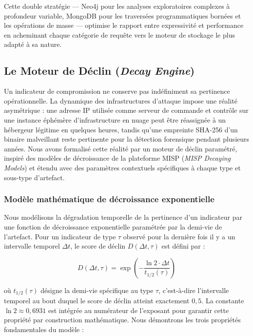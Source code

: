 Cette double stratégie --- Neo4j pour les analyses exploratoires complexes à profondeur variable, MongoDB pour les traversées programmatiques bornées et les opérations de masse --- optimise le rapport entre expressivité et performance en acheminant chaque catégorie de requête vers le moteur de stockage le plus adapté à sa nature.

\subsection{Le Moteur de Déclin (\textit{Decay Engine})}

Un indicateur de compromission ne conserve pas indéfiniment sa pertinence opérationnelle. La dynamique des infrastructures d'attaque impose une réalité asymétrique : une adresse IP utilisée comme serveur de commande et contrôle sur une instance éphémère d'infrastructure en nuage peut être réassignée à un hébergeur légitime en quelques heures, tandis qu'une empreinte SHA-256 d'un binaire malveillant reste pertinente pour la détection forensique pendant plusieurs années. Nous avons formalisé cette réalité par un moteur de déclin paramétré, inspiré des modèles de décroissance de la plateforme MISP (\textit{MISP Decaying Models}) et étendu avec des paramètres contextuels spécifiques à chaque type et sous-type d'artefact.

\subsubsection{Modèle mathématique de décroissance exponentielle}

Nous modélisons la dégradation temporelle de la pertinence d'un indicateur par une fonction de décroissance exponentielle paramétrée par la demi-vie de l'artefact. Pour un indicateur de type $\tau$ observé pour la dernière fois il y a un intervalle temporel $\Delta t$, le score de déclin $D(\Delta t, \tau)$ est défini par :

\begin{equation}
\label{eq:decay}
D(\Delta t, \tau) = \exp\!\left( -\frac{\ln 2 \cdot \Delta t}{t_{1/2}(\tau)} \right)
\end{equation}

où $t_{1/2}(\tau)$ désigne la demi-vie spécifique au type $\tau$, c'est-à-dire l'intervalle temporel au bout duquel le score de déclin atteint exactement $0{,}5$. La constante $\ln 2 \approx 0{,}6931$ est intégrée au numérateur de l'exposant pour garantir cette propriété par construction mathématique. Nous démontrons les trois propriétés fondamentales du modèle :

